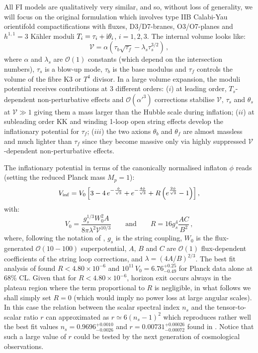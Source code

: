 \documentclass[aps,prd,a4paper,twocolumn,amsmath,showpacs,superscriptaddress,nofootinbib,preprintnumbers]{revtex4-1}
\newcommand{\be}{\begin{equation}}
\newcommand{\ee}{\end{equation}}
\newcommand{\mc}{\mathcal}
\newcommand{\vo}{\mathcal{V}}
\begin{document}
All FI models are qualitatively very similar, and so, without loss of generality, we will focus on the original formulation \cite{Cicoli:2008gp} which involves type IIB Calabi-Yau orientifold compactifications with fluxes, D3/D7-branes, O3/O7-planes and $h^{1,1}=3$ K\"ahler moduli $T_i=\tau_i +{\rm i} \theta_i$, $i=1,2,3$. The internal volume looks like:
\be
\vo=\alpha(\tau_b \sqrt{\tau_f}-\lambda_s \tau_s^{3/2})\,,
\ee
where $\alpha$ and $\lambda_s$ are $\mc{O}(1)$ constants (which depend on the intersection numbers), $\tau_s$ is a blow-up mode, $\tau_b$ is the base modulus and $\tau_f$ controls the volume of the fibre K3 or $T^4$ divisor. In a large volume expansion, the moduli potential receives contributions at 3 different orders: ($i$) at leading order, $T_s$-dependent non-perturbative effects and $\mc{O}(\alpha'^3)$ corrections stabilise $\vo$, $\tau_s$ and $\theta_s$ at $\vo\gg 1$ giving them a mass larger than the Hubble scale during inflation; ($ii$) at subleading order KK and winding 1-loop open string effects develop the inflationary potential for $\tau_f$; ($iii$) the two axions $\theta_b$ and $\theta_f$ are almost massless and much lighter than $\tau_f$ since they become massive only via highly suppressed $\vo$-dependent non-perturbative effects. 

The inflationary potential in terms of the canonically normalised inflaton $\phi$ reads (setting the reduced Planck mass $M_p = 1$):
\be
V_{\rm inf} = V_0\left[ 3-4 \,e^{-\frac{\phi}{\sqrt{3}} }  +  e^{-\frac{4\phi}{\sqrt{3}} }+ R\left(e^{\frac{2\phi}{\sqrt{3}} } - 1\right)\right],
\label{Vinf}
\ee
with:
\be
V_0 = \frac{g_s^{1/3} W_0^2 A}{8\pi \lambda^2 \vo^{10/3}}\qquad\text{and}\qquad
R = 16 g_s^4 \frac{AC}{B^2}\,,
\ee
where, following the notation of \cite{Cicoli:2018cgu}, $g_s$ is the string coupling, $W_0$ is the flux-generated $\mc{O}(10-100)$ superpotential, $A$, $B$ and $C$ are $\mc{O}(1)$ flux-dependent coefficients of the string loop corrections, and $\lambda = (4A/B)^{2/3}$. The best fit analysis of \cite{Cicoli:2020bao} found $R<4.80\times 10^{-6}$ and $10^{11}\, V_0=6.76^{+0.25}_{-0.49}$ for Planck data alone at $68\%$ CL. Given that for $R<4.80\times 10^{-6}$, horizon exit occurs always in the plateau region where the term proportional to $R$ is negligible, in what follows we shall simply set $R=0$ (which would imply no power loss at large angular scales). In this case the relation between the scalar spectral index $n_s$ and the tensor-to-scalar ratio $r$ can approximated as $r\simeq 6 (n_s-1)^2$ which reproduces rather well the best fit values $n_s=0.9696^{+0.0010}_{-0.0026}$ and $r=0.00731^{+0.00026}_{-0.00072}$ found in \cite{Cicoli:2020bao}. Notice that such a large value of $r$ could be tested by the next generation of cosmological observations.
\end{document}

